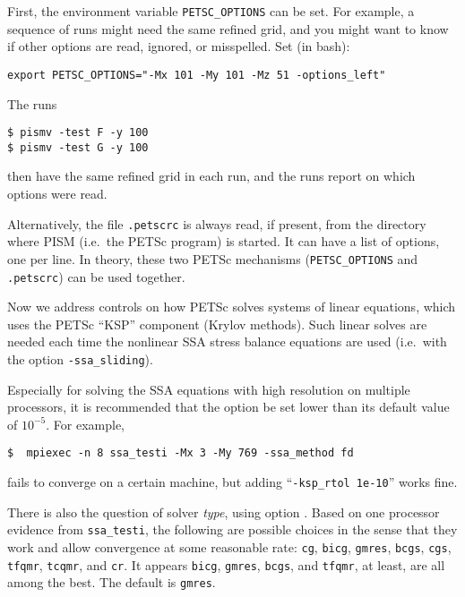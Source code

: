 First, the environment variable \texttt{PETSC_OPTIONS} can be set.  For example, a sequence of runs might need the same refined grid, and you might want to know if other options are read, ignored, or misspelled.  Set (in bash):

\texttt{export PETSC_OPTIONS="-Mx 101 -My 101 -Mz 51 -options_left"}

\noindent The runs 
\begin{verbatim}
$ pismv -test F -y 100
$ pismv -test G -y 100
\end{verbatim}
\noindent then have the same refined grid in each run, and the runs report on which options were read.

Alternatively, the file \texttt{.petscrc} is always read, if present, from the directory where PISM (i.e.~the PETSc program) is started.  It can have a list of options, one per line.   In theory, these two PETSc mechanisms (\verb|PETSC_OPTIONS| and \verb|.petscrc|) can be used together.


Now we address controls on how PETSc solves systems of linear equations, which uses the PETSc ``KSP'' component (Krylov methods).  Such linear solves are needed each time the nonlinear SSA stress balance equations are used (i.e.~with the option \texttt{-ssa_sliding}).

Especially for solving the SSA equations with high resolution on multiple processors, it is recommended that the option  be set lower than its default value of $10^{-5}$.  For example, 

\begin{verbatim}
$  mpiexec -n 8 ssa_testi -Mx 3 -My 769 -ssa_method fd
\end{verbatim}

\noindent fails to converge on a certain machine, but adding ``\verb|-ksp_rtol 1e-10|'' works fine.

There is also the question of solver \emph{type}, using option .  Based on one processor evidence from \texttt{ssa_testi}, the following are possible choices in the sense that they work and allow convergence at some reasonable rate: \texttt{cg}, \texttt{bicg}, \texttt{gmres}, \texttt{bcgs}, \texttt{cgs}, \texttt{tfqmr}, \texttt{tcqmr}, and \texttt{cr}.  It appears \texttt{bicg}, \texttt{gmres}, \texttt{bcgs}, and \texttt{tfqmr}, at least, are all among the best.  The default is \texttt{gmres}.

